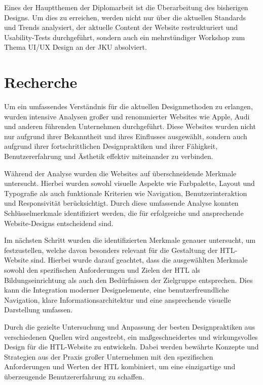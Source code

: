 Eines der Hauptthemen der Diplomarbeit ist die Überarbeitung des bisherigen Designs. 
Um dies zu erreichen, werden nicht nur über die aktuellen Standards und Trends analysiert, 
der aktuelle Content der Website restrukturiert und Usability-Tests durchgeführt, 
sondern auch ein mehrstündiger Workshop zum Thema UI/UX Design an der JKU absolviert.

\section{Recherche} \label{sec:Recherche}
Um ein umfassendes Verständnis für die aktuellen Designmethoden zu erlangen, wurden intensive Analysen großer und renommierter 
Websites wie Apple, Audi und anderen führenden Unternehmen durchgeführt. Diese Websites wurden nicht nur aufgrund ihrer Bekanntheit und 
ihres Einflusses ausgewählt, sondern auch aufgrund ihrer fortschrittlichen Designpraktiken und ihrer Fähigkeit, Benutzererfahrung und 
Ästhetik effektiv miteinander zu verbinden.

Während der Analyse wurden die Websites auf überschneidende Merkmale untersucht. Hierbei wurden sowohl visuelle Aspekte 
wie Farbpalette, Layout und Typografie als auch funktionale Kriterien wie Navigation, Benutzerinteraktion und Responsivität berücksichtigt. 
Durch diese umfassende Analyse konnten Schlüsselmerkmale identifiziert werden, die für erfolgreiche und ansprechende Website-Designs entscheidend sind.

Im nächsten Schritt wurden die identifizierten Merkmale genauer untersucht, um festzustellen, welche davon besonders relevant für die 
Gestaltung der HTL-Website sind. Hierbei wurde darauf geachtet, dass die ausgewählten Merkmale sowohl den spezifischen Anforderungen 
und Zielen der HTL als Bildungseinrichtung als auch den Bedürfnissen der Zielgruppe entsprechen. Dies kann die Integration moderner 
Designelemente, eine benutzerfreundliche Navigation, klare Informationsarchitektur und eine ansprechende visuelle Darstellung umfassen.

Durch die gezielte Untersuchung und Anpassung der besten Designpraktiken aus verschiedenen Quellen wird angestrebt, ein maßgeschneidertes 
und wirkungsvolles Design für die HTL-Website zu entwickeln. Dabei werden bewährte Konzepte und Strategien aus der Praxis großer Unternehmen 
mit den spezifischen Anforderungen und Werten der HTL kombiniert, um eine einzigartige und überzeugende Benutzererfahrung zu schaffen.

